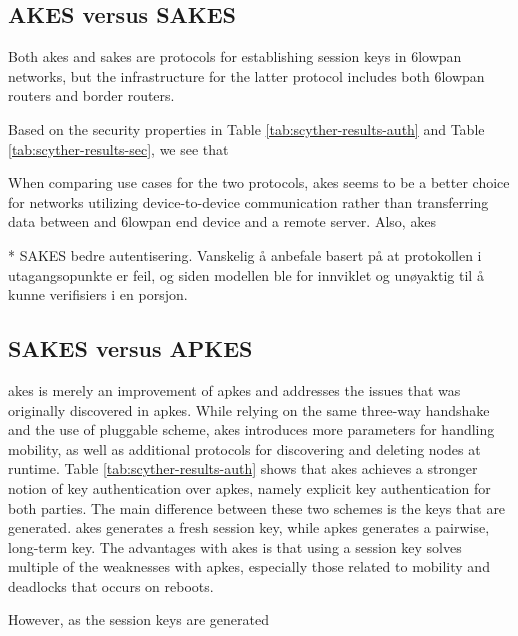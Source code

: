 \subsection{AKES versus SAKES}

Both \gls{akes} and \gls{sakes} are protocols for establishing session keys in \gls{6lowpan} networks, but the infrastructure for the latter protocol includes both \gls{6lowpan} routers and border routers.

Based on the security properties in Table \ref{tab:scyther-results-auth} and Table \ref{tab:scyther-results-sec}, we see that


When comparing use cases for the two protocols, \gls{akes} seems to be a better choice for networks utilizing device-to-device communication rather than transferring data between and \gls{6lowpan} end device and a remote server. Also, \gls{akes}


* SAKES bedre autentisering. Vanskelig å anbefale basert på at protokollen i utagangsopunkte er feil, og siden modellen ble for innviklet og unøyaktig til å kunne verifisiers i en porsjon.



\subsection{SAKES versus APKES}




% 


\gls{akes} is merely an improvement of \gls{apkes} and addresses the issues that was originally discovered in \gls{apkes}. While relying on the same three-way handshake and the use of pluggable scheme, \gls{akes} introduces more parameters for handling mobility, as well as additional protocols for discovering and deleting nodes at runtime. Table \ref{tab:scyther-results-auth} shows that \gls{akes} achieves a stronger notion of key authentication over \gls{apkes}, namely explicit key authentication for both parties. The main difference between these two schemes is the keys that are generated. \gls{akes} generates a fresh session key, while \gls{apkes} generates a pairwise, long-term key. The advantages with \gls{akes} is that using a session key solves multiple of the weaknesses with \gls{apkes}, especially those related to mobility and deadlocks that occurs on reboots.

However, as the session keys are generated 


